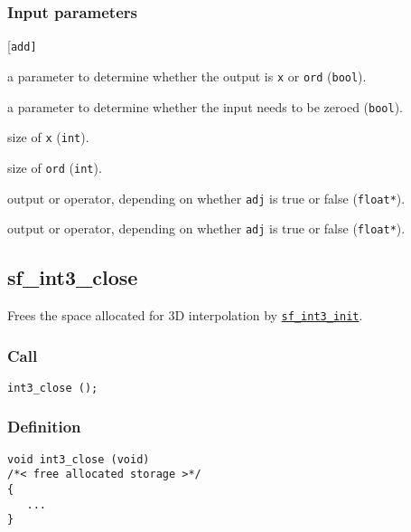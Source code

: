\subsubsection*{Input parameters}
\begin{desclist}{\tt }{\quad}[\tt add]
   \setlength\itemsep{0pt}
   \item[adj] a parameter to determine whether the output is \texttt{x} or \texttt{ord} (\texttt{bool}).
   \item[add] a parameter to determine whether the input needs to be zeroed (\texttt{bool}).
   \item[nm]  size of \texttt{x} (\texttt{int}).
   \item[ny]  size of \texttt{ord} (\texttt{int}).
   \item[x]   output or operator, depending on whether \texttt{adj} is true or false (\texttt{float*}).
   \item[ord] output or operator, depending on whether \texttt{adj} is true or false (\texttt{float*}).
\end{desclist}




\subsection{{sf\_int3\_close}}
Frees the space allocated for 3D interpolation by \hyperref[sec:sf_int3_init]{\texttt{sf\_int3\_init}}.

\subsubsection*{Call}
\begin{verbatim}int3_close ();\end{verbatim}

\subsubsection*{Definition}
\begin{verbatim}
void int3_close (void)
/*< free allocated storage >*/
{
   ...
}
\end{verbatim}


